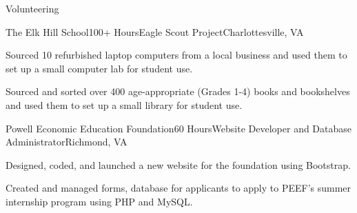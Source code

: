 \documentclass{resume} %
\begin{document}

\begin{rSection}{Volunteering}

\begin{rSubsection}{The Elk Hill School}{100+ Hours}{Eagle Scout Project}{Charlottesville, VA}
\item Sourced 10 refurbished laptop computers from a local business and used them
to set up a small computer lab for student use.
\item Sourced and sorted over 400 age-appropriate (Grades 1-4) books and bookshelves and used them to set up a small library for student use.
\end{rSubsection}

\begin{rSubsection}{Powell Economic Education Foundation}{60 Hours}{Website Developer and Database Administrator}{Richmond, VA}
\item Designed, coded, and launched a new  website for the foundation using Bootstrap.
\item Created and managed forms, database for applicants to apply to PEEF's summer internship program using PHP and MySQL.
\end{rSubsection}

\end{rSection}







\end{document}
